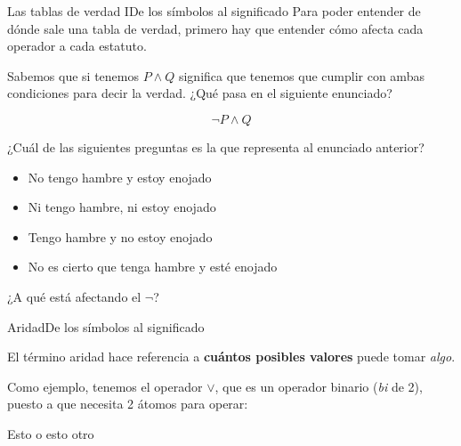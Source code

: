 \documentclass[spanish, c]{beamer}
\begin{document}
\begin{frame}{Las tablas de verdad I}{De los símbolos al significado}
    Para poder entender de dónde sale una \alert{tabla de verdad}, primero hay que entender cómo afecta cada operador a cada estatuto. \pause

    \bigskip

    Sabemos que si tenemos $P \wedge Q$ significa que tenemos que cumplir con ambas condiciones para decir la verdad.
    ¿Qué pasa en el siguiente enunciado? \pause

    \bigskip

    \[\neg P \wedge Q\] \pause

    ¿Cuál de las siguientes preguntas es la que representa al enunciado anterior? \pause

    \begin{itemize}[<+->]
        \item No tengo hambre y estoy enojado
        \item Ni tengo hambre, ni estoy enojado
        \item Tengo hambre y no estoy enojado
        \item No es cierto que tenga hambre y esté enojado
    \end{itemize} \pause

    ¿A qué está afectando el $\neg$?
\end{frame}

\begin{frame}{Aridad}{De los símbolos al significado}

    El término \alert{aridad} hace referencia a \textbf{cuántos posibles valores} puede tomar \textit{algo}. \pause

    \bigskip

    Como ejemplo, tenemos el operador $\vee$, que es un operador \alert{binario} (\textit{bi} de 2), puesto a que necesita 2 átomos para operar: \pause

    \bigskip

    \begin{center}
        \alert<4>{Esto} o \alert<5>{esto otro} \pause
    \end{center}

    \bigskip


\end{frame}
\end{document}
